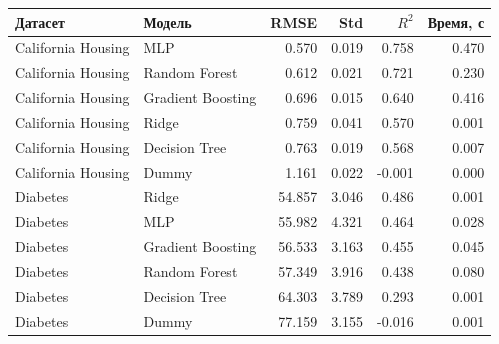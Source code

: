 \begin{center}
\small
\begin{tabular}{llrrrr}
\toprule
Датасет & Модель & RMSE & Std & $R^2$ & Время, с \\
\midrule
California Housing & MLP & 0.570 & 0.019 & 0.758 & 0.470 \\
California Housing & Random Forest & 0.612 & 0.021 & 0.721 & 0.230 \\
California Housing & Gradient Boosting & 0.696 & 0.015 & 0.640 & 0.416 \\
California Housing & Ridge & 0.759 & 0.041 & 0.570 & 0.001 \\
California Housing & Decision Tree & 0.763 & 0.019 & 0.568 & 0.007 \\
California Housing & Dummy & 1.161 & 0.022 & -0.001 & 0.000 \\
Diabetes & Ridge & 54.857 & 3.046 & 0.486 & 0.001 \\
Diabetes & MLP & 55.982 & 4.321 & 0.464 & 0.028 \\
Diabetes & Gradient Boosting & 56.533 & 3.163 & 0.455 & 0.045 \\
Diabetes & Random Forest & 57.349 & 3.916 & 0.438 & 0.080 \\
Diabetes & Decision Tree & 64.303 & 3.789 & 0.293 & 0.001 \\
Diabetes & Dummy & 77.159 & 3.155 & -0.016 & 0.001 \\
\bottomrule
\end{tabular}
\end{center}
